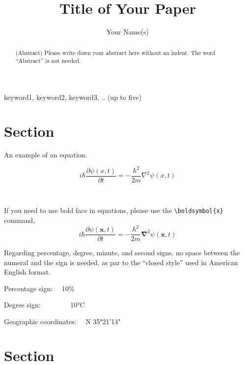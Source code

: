 \documentclass[authorproof,JRM,paper]{fujipressarticle}
\begin{document}
\pagestyle{fujipressstyle}

\title{Title of Your Paper}
\author{Your Name(s)}
\address{Your Institute(s)\\
	Address(es) of Your Institute\\
	E-mail: Your E-mail address(es)}
\maketitle


\begin{abstract}%
	\noindent (Abstract) Please write down your abstract here without an indent.  The word ``Abstract'' is not needed.  
\end{abstract}

\begin{keywords}
	keyword1, keyword2, keyword3, .. (up to five)
\end{keywords}


\section{Section}
An example of an equation.

\begin{equation}
	i \hbar \frac{\partial \psi (x,t)}{\partial  t} = -\frac{\hbar ^2}{2m}{\nabla}^2 \psi (x,t)
\end{equation}\par
~\par
If you need to use bold face in equations, please use the \verb|\boldsymbol{x}| command,
\begin{equation}
	i \hbar \frac{\partial \psi (\boldsymbol{x},t)}{\partial  t} = -\frac{\hbar ^2}{2m}\boldsymbol{{\nabla}}^2 \psi (\boldsymbol{x},t)
\end{equation}


Regarding percentage, degree, minute, and second signs, no space between the numeral and the sign is needed, as par to the “closed style” used in American English format.\par
  Percentage sign: ~~10\%\par
  Degree sign: ~~~~~~~~10°C\par
  Geographic coordinates: ~~N 35°21'14" \par


\section{Section}
\end{document}
